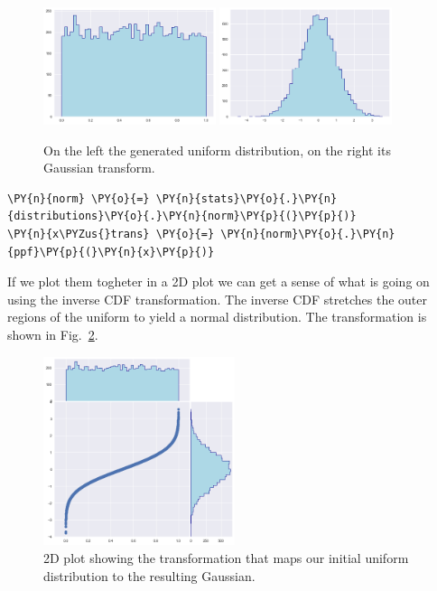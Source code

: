 \begin{figure}[h]
  \centering
  \includegraphics[width=0.45\textwidth]{copula_files/copula_5_0.png}\qquad
  \includegraphics[width=0.45\textwidth]{copula_files/copula_7_0.png}
  \caption{On the left the generated uniform distribution, on the right its Gaussian transform.}
  \label{fig:uniform_and_gauss}
\end{figure}

\begin{tcolorbox}[breakable, size=fbox, boxrule=1pt, pad at break*=1mm,colback=cellbackground, colframe=cellborder]
\begin{Verbatim}[commandchars=\\\{\}]
\PY{n}{norm} \PY{o}{=} \PY{n}{stats}\PY{o}{.}\PY{n}{distributions}\PY{o}{.}\PY{n}{norm}\PY{p}{(}\PY{p}{)} 
\PY{n}{x\PYZus{}trans} \PY{o}{=} \PY{n}{norm}\PY{o}{.}\PY{n}{ppf}\PY{p}{(}\PY{n}{x}\PY{p}{)}
\end{Verbatim}
\end{tcolorbox}

    If we plot them togheter in a 2D plot we can get a sense of what is
going on using the inverse CDF transformation.
The inverse CDF stretches the outer regions of the uniform to yield a
normal distribution. The transformation is shown in Fig.~\ref{fig:uniform_to_gauss}. 
    
\begin{figure}[htb]
  \centering
  \includegraphics[width=0.5\textwidth]{copula_files/copula_9_0.png}
  \caption{2D plot showing the transformation that maps our initial uniform distribution to the resulting Gaussian.}
  \label{fig:uniform_to_gauss}
\end{figure}
    
